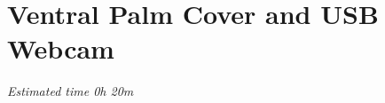 
\chapter{Ventral Palm Cover and USB Webcam}  %

\label{Ventral Palm Cover and USB Webcam} 
%
%

\textit{Estimated time 0h 20m}

